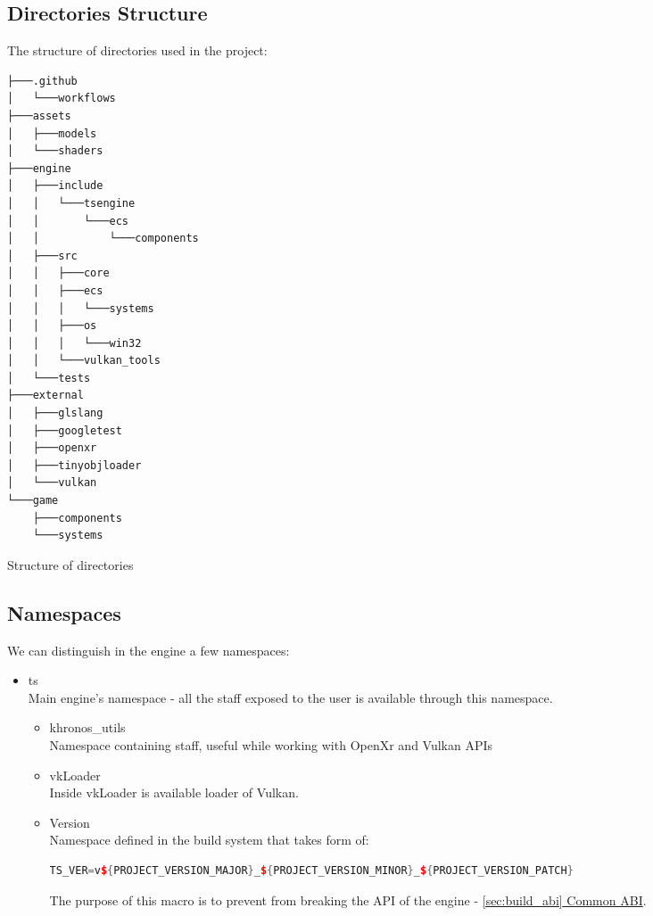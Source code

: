 \subsection{Directories Structure}
The structure of directories used in the project:
\begin{verbatim}
├───.github
│   └───workflows
├───assets
│   ├───models
│   └───shaders
├───engine
│   ├───include
│   │   └───tsengine
│   │       └───ecs
│   │           └───components
│   ├───src
│   │   ├───core
│   │   ├───ecs
│   │   │   └───systems
│   │   ├───os
│   │   │   └───win32
│   │   └───vulkan_tools
│   └───tests
├───external
│   ├───glslang
│   ├───googletest
│   ├───openxr
│   ├───tinyobjloader
│   └───vulkan
└───game
    ├───components
    └───systems
\end{verbatim}
\begin{table}[h]
\caption{Structure of directories}
\end{table}

\subsection{Namespaces}
\label{sec:namespaces}
We can distinguish in the engine a few namespaces:
\begin{itemize}
    \item ts\\
    Main engine's namespace - all the staff exposed to the user is available through this namespace.
    \begin{itemize}
        \item khronos\_utils\\
            Namespace containing staff, useful while working with OpenXr and Vulkan APIs
        \item vkLoader\\
            Inside vkLoader is available loader of Vulkan.
        \item Version\\
            Namespace defined in the build system that takes form of:
\begin{lstlisting}[language=c++, caption= Definition of TS\_VER preprocessor macro (.engine/CMakeLists.txt)]
TS_VER=v${PROJECT_VERSION_MAJOR}_${PROJECT_VERSION_MINOR}_${PROJECT_VERSION_PATCH}
\end{lstlisting}
            The purpose of this macro is to prevent from breaking the API of the engine - \hyperref[sec:build_abi]{\ref*{sec:build_abi} Common ABI}.
    \end{itemize}
\end{itemize}